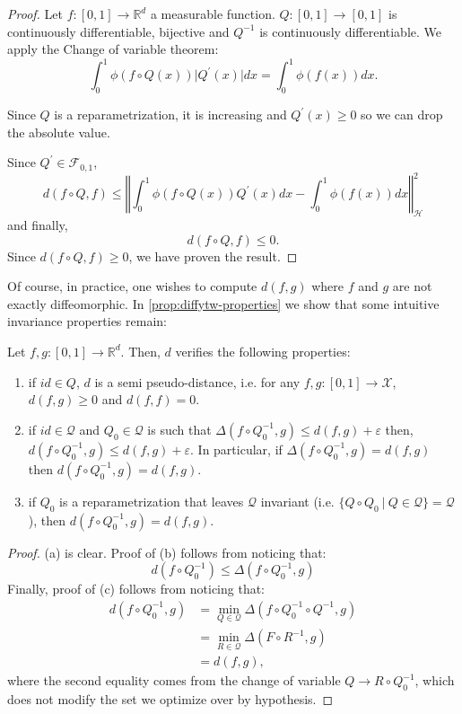 \begin{proof}
Let $f: [0,1] \to\mathbb R^d$ a measurable function. $Q:[0,1] \to [0,1]$ is continuously differentiable, bijective and $Q^{-1}$ is continuously differentiable. We apply the Change of variable theorem:
\begin{equation}
\int_0^1 \phi(f\circ Q(x))\vert Q^\prime(x)\vert dx = \int_0^1 \phi(f(x))dx.
\end{equation}

Since $Q$ is a reparametrization, it is increasing and $Q^\prime(x) \geq 0$ so we can drop the absolute value.

Since $Q^\prime \in \mathcal F_{0,1}$,
\begin{equation}
    d(f\circ Q, f) \leq \left \Vert \int_0^1 \phi(f\circ Q(x))Q^\prime(x)dx - \int_0^1 \phi(f(x))dx\right\Vert_\mathcal H^2
\end{equation}
and finally,
\begin{equation}
    d(f\circ Q, f) \leq 0.
\end{equation}
Since $d(f\circ Q, f) \geq 0$, we have proven the result.
\end{proof}


Of course, in practice, one wishes to compute $d(f, g)$ where $f$ and $g$ are not exactly diffeomorphic. In \cref{prop:diffytw-properties} we show that some intuitive invariance properties remain:
\begin{proposition}\label{prop:diffytw-properties} Let $f, g:[0,1] \to\mathbb R^d$. Then, $d$ verifies the following properties:
\begin{enumerate}
\item[(a)]if $id \in Q$, $d$ is a semi pseudo-distance, i.e. for any $f, g: [0,1] \to\mathcal X$,  $d(f, g)\geq 0$ and $d(f, f)=0$.
\item[(b)]if $id \in \mathcal Q$ and $Q_0\in\mathcal Q$ is such that $\Delta(f\circ Q_0^{-1}, g) \leq d(f, g) + \varepsilon$ then, $d(f \circ Q_0^{-1}, g) \leq d(f, g) + \varepsilon$. In particular, if $\Delta(f\circ Q_0^{-1}, g) = d(f,g)$ then $d(f\circ Q_0^{-1}, g)=d(f, g)$.
\item[(c)] if $Q_0$ is a reparametrization that leaves $\mathcal Q$ invariant (i.e. $\lbrace Q\circ Q_0 ~\vert~ Q\in \mathcal Q \rbrace = \mathcal Q$), then $d(f\circ Q_0^{-1}, g) = d(f, g)$.
\end{enumerate}
\end{proposition}
\begin{proof} (a) is clear. Proof of (b) follows from noticing that:
\begin{equation}
d(f\circ Q_0^{-1}) \leq \Delta(f\circ Q_0^{-1}, g)
\end{equation}
Finally, proof of (c) follows from noticing that:
\begin{align}
d(f \circ Q_0^{-1}, g) &= \min_{Q\in\mathcal Q}\Delta(f\circ Q_0^{-1} \circ Q^{-1}, g)\\
& = \min_{R\in\mathcal Q} \Delta(F\circ R^{-1}, g)\\
& = d(f, g),
\end{align} where the second equality comes from the change of variable $Q \to R \circ Q_0^{-1}$, which does not modify the set we optimize over by hypothesis.
\end{proof}

